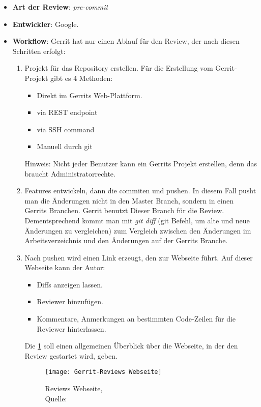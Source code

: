 \begin{itemize}
	\item \textbf{Art der Review}: \textit{pre-commit}
	\item \textbf{Entwickler}: Google.
	\item \textbf{Workflow}: Gerrit hat nur einen Ablauf für den Review, der nach diesen Schritten erfolgt:
		\begin{enumerate}
			\item Projekt für das Repository erstellen. Für die Erstellung vom Gerrit-Projekt gibt es 4 Methoden:
			\begin{itemize}
				\item Direkt im Gerrits Web-Plattform.
				\item via REST endpoint
				\item via SSH command
				\item Manuell durch git
			\end{itemize}
			Hinweis: Nicht jeder Benutzer kann ein Gerrits Projekt erstellen, denn das braucht Administratorrechte.		
			
			\item Features entwickeln, dann die commiten und pushen. In diesem Fall pusht man die Änderungen nicht in den Master Branch, sondern in einen Gerrits Branchen.
				Gerrit benutzt Dieser Branch für die Review. Dementsprechend kommt man mit \textit{git diff} (git Befehl, um alte und neue Änderungen zu vergleichen) zum Vergleich
				zwischen den Änderungen im Arbeitsverzeichnis und den Änderungen auf der Gerrits Branche.
			\item Nach pushen wird einen Link erzeugt, den zur Webseite führt. Auf dieser Webseite kann der Autor: 
			\begin{itemize}
				\item Diffs anzeigen lassen.
				\item Reviewer hinzufügen.
				\item Kommentare, Anmerkungen an bestimmten Code-Zeilen für die Reviewer hinterlassen.
			\end{itemize}
			Die \cref{fig:Gerrit-Reviews Webseite} soll einen allgemeinen Überblick über die Webseite, in der den Review gestartet wird, geben.
			
			\begin{figure}[H]
				\centering
				\texttt{[image: Gerrit-Reviews Webseite]}
				\caption[Gerrit]{Reviews Webseite,\\ Quelle: \cite{Gerrit}}
				\label{fig:Gerrit-Reviews Webseite}
			\end{figure}
						

\end{enumerate}
\end{itemize}
